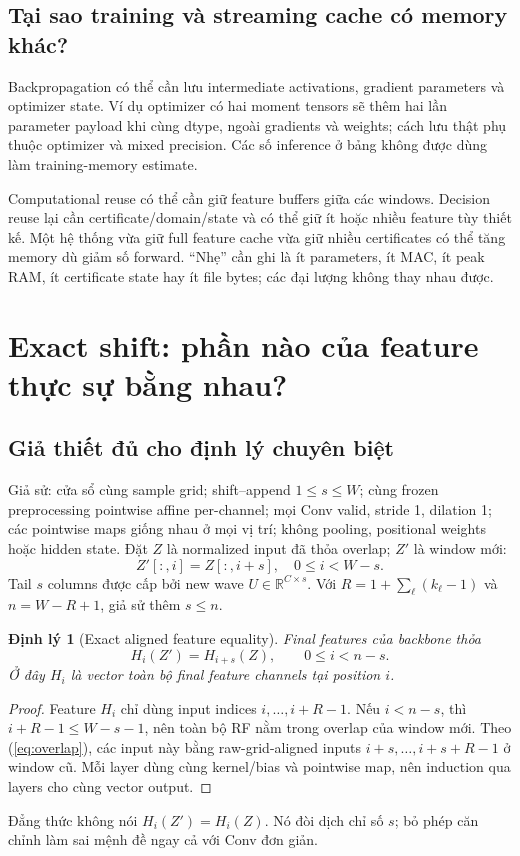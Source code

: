 \documentclass[11pt,a4paper]{article}
\newcommand{\R}{\mathbb R}
\newtheorem{theorem}[proposition]{Định lý}
\theoremstyle{definition}
\begin{document}
\subsection{Tại sao training và streaming cache có memory khác?}
Backpropagation có thể cần lưu intermediate activations, gradient
parameters và optimizer state. Ví dụ optimizer có hai moment tensors
sẽ thêm hai lần parameter payload khi cùng dtype, ngoài gradients và
weights; cách lưu thật phụ thuộc optimizer và mixed precision. Các số
inference ở bảng không được dùng làm training-memory estimate.

Computational reuse có thể cần giữ feature buffers giữa các windows.
Decision reuse lại cần certificate/domain/state và có thể giữ ít hoặc
nhiều feature tùy thiết kế. Một hệ thống vừa giữ full feature cache vừa
giữ nhiều certificates có thể tăng memory dù giảm số forward. ``Nhẹ''
cần ghi là ít parameters, ít MAC, ít peak RAM, ít certificate state hay
ít file bytes; các đại lượng không thay nhau được.

\section{Exact shift: phần nào của feature thực sự bằng nhau?}
\subsection{Giả thiết đủ cho định lý chuyên biệt}
Giả sử: cửa sổ cùng sample grid; shift--append $1\le s\le W$; cùng
frozen preprocessing pointwise affine per-channel; mọi Conv valid,
stride 1, dilation 1; các pointwise maps giống nhau ở mọi vị trí; không
pooling, positional weights hoặc hidden state. Đặt $Z$ là normalized
input đã thỏa overlap; $Z'$ là window mới:
\begin{equation}
Z'[:,i]=Z[:,i+s],\quad 0\le i<W-s.
\label{eq:overlap}
\end{equation}
Tail $s$ columns được cấp bởi new wave $U\in\R^{C\times s}$. Với
$R=1+\sum_\ell(k_\ell-1)$ và $n=W-R+1$, giả sử thêm $s\le n$.

\begin{theorem}[Exact aligned feature equality]
Final features của backbone thỏa
\begin{equation}
H_i(Z')=H_{i+s}(Z),\qquad 0\le i<n-s.
\label{eq:shift}
\end{equation}
Ở đây $H_i$ là vector toàn bộ final feature channels tại position $i$.
\end{theorem}
\begin{proof}
Feature $H_i$ chỉ dùng input indices $i,\ldots,i+R-1$. Nếu $i<n-s$,
thì $i+R-1\le W-s-1$, nên toàn bộ RF nằm trong overlap của window mới.
Theo (\ref{eq:overlap}), các input này bằng raw-grid-aligned inputs
$i+s,\ldots,i+s+R-1$ ở window cũ. Mỗi layer dùng cùng kernel/bias và
pointwise map, nên induction qua layers cho cùng vector output.
\end{proof}
Đẳng thức không nói $H_i(Z')=H_i(Z)$. Nó đòi dịch chỉ số $s$; bỏ phép
căn chỉnh làm sai mệnh đề ngay cả với Conv đơn giản.
\end{document}
